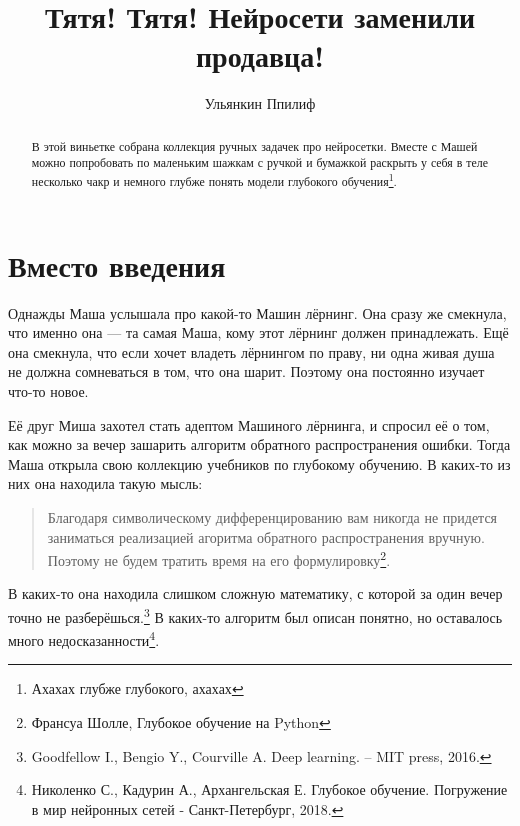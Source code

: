 \documentclass[12pt, a4paper, oneside]{article}
\title{Тятя! Тятя! Нейросети заменили продавца!}
\date{ }
\author{Ульянкин Ппилиф}
\begin{document}
\togglefalse{lecture}

\maketitle

	
\begin{abstract}
    В этой виньетке собрана коллекция ручных задачек про нейросетки. Вместе с Машей можно попробовать по маленьким шажкам с ручкой и бумажкой раскрыть у себя в теле несколько чакр и немного глубже понять модели глубокого обучения\footnote{Ахахах глубже глубокого, ахахах}.
\end{abstract}

\section*{Вместо введения}
    Однажды Маша услышала про какой-то Машин лёрнинг. Она сразу же смекнула, что именно она --- та самая Маша, кому этот лёрнинг должен принадлежать. Ещё она смекнула, что если хочет владеть лёрнингом по праву, ни одна живая душа не должна сомневаться в том, что она шарит. Поэтому она постоянно изучает что-то новое. 
    
    Её друг Миша захотел стать адептом Машиного лёрнинга, и спросил её о том, как можно за вечер зашарить алгоритм обратного распространения ошибки. Тогда Маша открыла свою коллекцию учебников по глубокому обучению. В каких-то из них она находила такую мысль:  
    
    \begin{quote}
    Благодаря символическому дифференцированию вам никогда не придется заниматься реализацией агоритма обратного распространения вручную. Поэтому не будем тратить время на его формулировку\footnote{Франсуа Шолле, Глубокое обучение на Python}.
    \end{quote} 
    
    В каких-то она находила слишком сложную математику, с которой за один вечер точно не разберёшься.\footnote{Goodfellow I., Bengio Y., Courville A. Deep learning. – MIT press, 2016.} В каких-то алгоритм был описан понятно, но оставалось много недосказанности\footnote{Николенко С., Кадурин А., Архангельская Е. Глубокое обучение. Погружение в мир нейронных сетей - Санкт-Петербург, 2018.}. 
    
\end{document}
